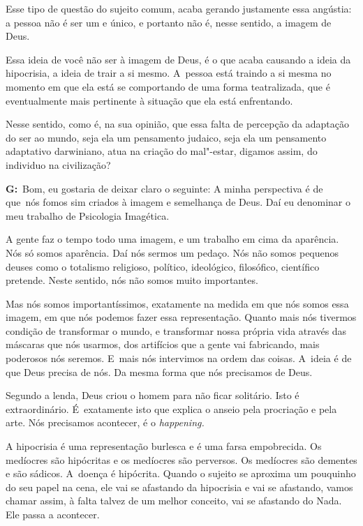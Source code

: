  

Esse tipo de questão do sujeito comum, acaba gerando justamente essa
angústia: a pessoa não é ser um e único, e portanto não é, nesse
sentido, a imagem de Deus.

 

Essa ideia de você não ser à imagem de Deus, é o que acaba causando a
ideia da hipocrisia, a ideia de trair a si mesmo. A~pessoa está traindo
a si mesma no momento em que ela está se comportando de uma forma
teatralizada, que é eventualmente mais pertinente à situação que ela
está enfrentando.

 

Nesse sentido, como é, na sua opinião, que essa falta de percepção da
adaptação do ser ao mundo, seja ela um pensamento judaico, seja ela um
pensamento adaptativo darwiniano, atua na criação do mal"-estar, digamos
assim, do individuo na civilização?

 

\textbf{G:}~Bom, eu gostaria de deixar claro o seguinte: A minha
perspectiva é de que\textbf{}~nós fomos sim criados à imagem e
semelhança de Deus. Daí eu denominar o meu trabalho de Psicologia
Imagética.

 

A gente faz o tempo todo uma imagem, e um trabalho em cima da aparência.
Nós só somos aparência. Daí nós sermos um pedaço. Nós não somos pequenos
deuses como o totalismo religioso, político, ideológico, filosófico,
científico pretende. Neste sentido, nós não somos muito importantes.

 

Mas nós somos importantíssimos, exatamente na medida em que nós somos
essa imagem, em que nós podemos fazer essa representação. Quanto mais
nós tivermos condição de transformar o mundo, e transformar nossa
própria vida através das máscaras que nós usarmos, dos artifícios que a
gente vai fabricando, mais poderosos nós seremos. E~mais nós intervimos
na ordem das coisas. A~ideia é de que Deus precisa de nós. Da mesma
forma que nós precisamos de Deus.

 

Segundo a lenda, Deus criou o homem para não ficar solitário. Isto é
extraordinário. É~exatamente isto que explica o anseio pela procriação e
pela arte. Nós precisamos acontecer, é o \emph{happening.}

 

A hipocrisia é uma representação burlesca e é uma farsa empobrecida. Os
medíocres são hipócritas e os medíocres são perversos. Os medíocres são
dementes e são sádicos. A~doença é hipócrita. Quando o sujeito se
aproxima um pouquinho do seu papel na cena, ele vai se afastando da
hipocrisia e vai se afastando, vamos chamar assim, à falta talvez de um
melhor conceito, vai se afastando do Nada. Ele passa a acontecer.

